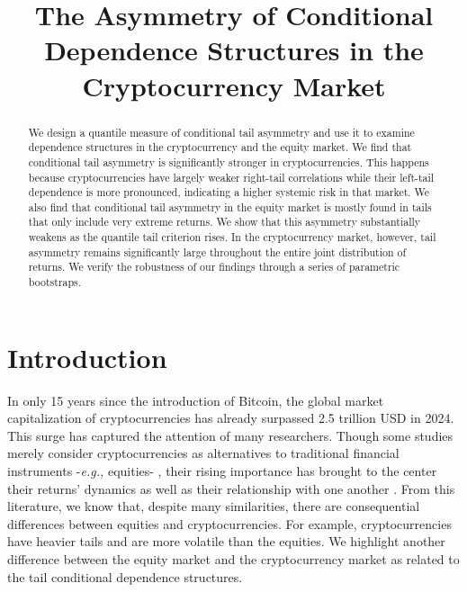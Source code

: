 \documentclass{article}
\begin{document}
\title{The Asymmetry of Conditional Dependence Structures in the Cryptocurrency Market}

\maketitle
\begin{abstract}
We design a quantile measure of conditional tail asymmetry and use it to examine dependence structures in the cryptocurrency and the equity market. We find that conditional tail asymmetry is significantly stronger in cryptocurrencies. This happens because cryptocurrencies have largely weaker right-tail correlations while their left-tail dependence is more pronounced, indicating a higher systemic risk in that market. We also find that conditional tail asymmetry in the equity market is mostly found in tails that only include very extreme returns. We show that this asymmetry substantially weakens as the quantile tail criterion rises. In the cryptocurrency market, however, tail asymmetry remains significantly large throughout the entire joint distribution of returns. We verify the robustness of our findings through a series of parametric bootstraps.\par  
\end{abstract}

\section{Introduction}
In only 15 years since the introduction of Bitcoin, the global market capitalization of cryptocurrencies has already surpassed 2.5 trillion USD in 2024. This surge has captured the attention of many researchers. Though some studies merely consider cryptocurrencies as alternatives to traditional financial instruments -\textit{e.g.,} equities- \citep{guesmi2019, Bouri2020, wen2022}, their rising importance has brought to the center their returns' dynamics as well as their relationship with one another \citep{liu2019, li2022}. From this literature, we know that, despite many similarities, there are consequential differences between equities and cryptocurrencies. For example, cryptocurrencies have heavier tails \citep{Gkillas2018} and are more volatile \citep{fung2021, malek2023} than the equities. We highlight another difference between the equity market and the cryptocurrency market as related to the tail conditional dependence structures.  \par
\end{document}
